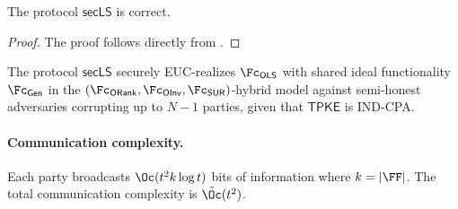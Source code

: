  
 \begin{lemma}[Correctness]
 The protocol $\mathsf{secLS}$ is correct.
 \end{lemma}{}
 \begin{proof}
   The proof follows directly from \cite{KaltofenSaunders91,TCC:KMWF07}.
 \end{proof}{}
 
 \begin{lemma}
   The protocol $\mathsf{secLS}$ securely EUC-realizes $\Fc_\mathsf{OLS}$  with shared ideal functionality $\Fc_\mathsf{Gen}$ in the $(\Fc_\mathsf{ORank},\Fc_\mathsf{OInv},\Fc_\mathsf{SUR})$-hybrid model against semi-honest adversaries corrupting up to $N-1$ parties, given that $\mathsf{TPKE}$ is IND-CPA.
 \end{lemma}{}

  \paragraph{Communication complexity.} Each party broadcasts $\Oc(t^2k\log t)$ bits of information where $k=|\FF|$. The total communication complexity is $\tilde \Oc(t^2)$.


